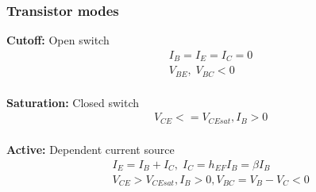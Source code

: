\newpage
\subsubsection{Transistor modes}
\noindent\textbf{Cutoff:}
Open switch
\begin{align*}
    &I_B = I_E = I_C = 0 \\
    &V_{BE}, \; V_{BC} < 0 \\
\end{align*}

\noindent\textbf{Saturation:}
Closed switch
\begin{align*}
    &V_{CE} <= V_{CEsat}, I_B>0 \\
\end{align*}

\noindent\textbf{Active:}
Dependent current source
\begin{align*}
    &I_E = I_B + I_C, \; I_C = h_{EF} I_B = \beta I_B \\
    &V_{CE} > V_{CEsat}, I_B>0, V_{BC} = V_B-V_C < 0 \\
\end{align*}


%
%
%

